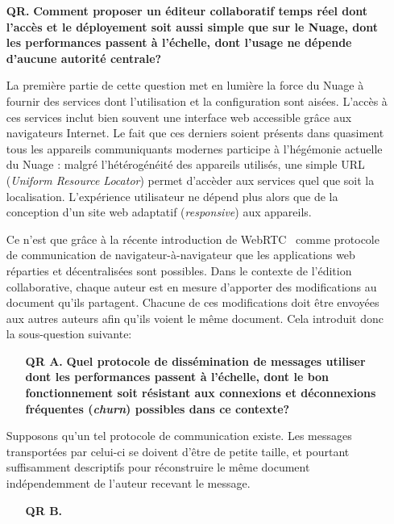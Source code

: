\begin{itemize}
\item [\textbf{QR.}] \textbf{Comment proposer un éditeur collaboratif temps réel
    dont l'accès et le déployement soit aussi simple que sur le Nuage, dont les
    performances passent à l'échelle, dont l'usage ne dépende d'aucune autorité
    centrale?}
  
  La première partie de cette question met en lumière la force du Nuage à
  fournir des services dont l'utilisation et la configuration sont
  aisées. L'accès à ces services inclut bien souvent une interface web
  accessible grâce aux navigateurs Internet. Le fait que ces derniers soient
  présents dans quasiment tous les appareils communiquants modernes participe à
  l'hégémonie actuelle du Nuage : malgré l'hétérogénéité des appareils utilisés,
  une simple URL (\emph{Uniform Resource Locator}) permet d'accèder aux services
  quel que soit la localisation. L'expérience utilisateur ne dépend plus alors
  que de la conception d'un site web adaptatif (\emph{responsive}) aux
  appareils.

  Ce n'est que grâce à la récente introduction de WebRTC~\cite{webrtc} comme
  protocole de communication de navigateur-à-navigateur que les applications web
  réparties et décentralisées sont possibles. Dans le contexte de l'édition
  collaborative, chaque auteur est en mesure d'apporter des modifications au
  document qu'ils partagent. Chacune de ces modifications doit être envoyées aux
  autres auteurs afin qu'ils voient le même document.  Cela
  introduit donc la sous-question suivante:
  \begin{itemize}
  \item [\textbf{QR A.}] \textbf{Quel protocole de dissémination de messages
      utiliser dont les performances passent à l'échelle, dont le bon
      fonctionnement soit résistant aux connexions et déconnexions fréquentes
      (\emph{churn}) possibles dans ce contexte?}    
  \end{itemize}

  Supposons qu'un tel protocole de communication existe. Les messages
  transportées par celui-ci se doivent d'être de petite taille, et pourtant
  suffisamment descriptifs pour réconstruire le même document indépendemment de
  l'auteur recevant le message.
  \begin{itemize}
  \item [\textbf{QR B.}] \textbf{}
  \end{itemize}
\end{itemize}

